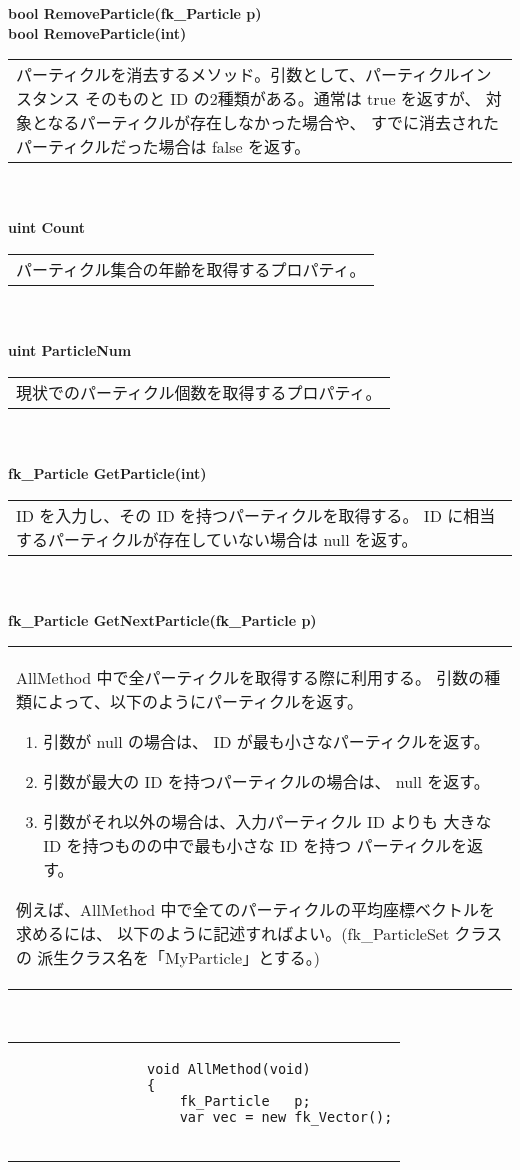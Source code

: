 \begin{tabbing}
\> \textbf{bool RemoveParticle(fk\_Particle p)} \\
\> \textbf{bool RemoveParticle(int)} \\
	\> \> \begin{tabular}{p{15cm}}
		パーティクルを消去するメソッド。引数として、パーティクルインスタンス
		そのものと ID の2種類がある。通常は true を返すが、
		対象となるパーティクルが存在しなかった場合や、
		すでに消去されたパーティクルだった場合は false を返す。
	\end{tabular} \\ \\

\> \textbf{uint Count} \\
	\> \> \begin{tabular}{p{15cm}}
		パーティクル集合の年齢を取得するプロパティ。
	\end{tabular} \\ \\

\> \textbf{uint ParticleNum} \\
	\> \> \begin{tabular}{p{15cm}}
		現状でのパーティクル個数を取得するプロパティ。
	\end{tabular} \\ \\

\> \textbf{fk\_Particle GetParticle(int)} \\
	\> \> \begin{tabular}{p{15cm}}
		ID を入力し、その ID を持つパーティクルを取得する。
		ID に相当するパーティクルが存在していない場合は null を返す。
	\end{tabular} \\ \\

\> \textbf{fk\_Particle GetNextParticle(fk\_Particle p)} \\
	\> \> \begin{tabular}{p{15cm}}
		AllMethod 中で全パーティクルを取得する際に利用する。
		引数の種類によって、以下のようにパーティクルを返す。
		\begin{enumerate}
		 \item 引数が null の場合は、
			ID が最も小さなパーティクルを返す。
		 \item 引数が最大の ID を持つパーティクルの場合は、
			null を返す。
		 \item 引数がそれ以外の場合は、入力パーティクル ID よりも
			大きな ID を持つものの中で最も小さな ID を持つ
			パーティクルを返す。
		\end{enumerate}
		例えば、AllMethod 中で全てのパーティクルの平均座標ベクトルを
		求めるには、
		以下のように記述すればよい。(fk\_ParticleSet クラスの
		派生クラス名を「MyParticle」とする。)
	\end{tabular} \\
	\> \> \begin{tabular}{p{15cm}}
		\begin{screen}
		\begin{verbatim}
		        void AllMethod(void)
		        {
		            fk_Particle   p;
		            var vec = new fk_Vector();


\end{verbatim}
\end{screen}
\end{tabular}
\end{tabbing}
